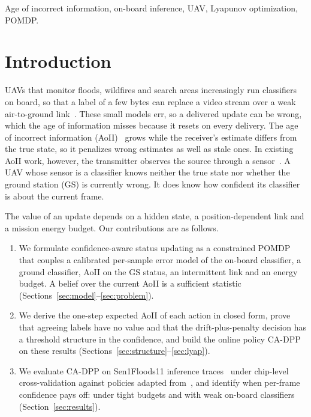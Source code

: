 \documentclass[conference]{IEEEtran}
\theoremstyle{remark}
\begin{document}
\begin{IEEEkeywords}
Age of incorrect information, on-board inference, UAV, Lyapunov optimization, POMDP.
\end{IEEEkeywords}

\section{Introduction}
UAVs that monitor floods, wildfires and search areas increasingly run classifiers on board, so that a label of a few bytes can replace a video stream over a weak air-to-ground link~\cite{shamsoshoara2021flame,kyrkou2020aider}. These small models err, so a delivered update can be wrong, which the age of information misses because it resets on every delivery. The age of incorrect information (AoII)~\cite{maatouk2020aoii} grows while the receiver's estimate differs from the true state, so it penalizes wrong estimates as well as stale ones. In existing AoII work, however, the transmitter observes the source through a sensor~\cite{maatouk2020aoii,zakeri2023aoiieh,ngo2025eh}. A UAV whose sensor is a classifier knows neither the true state nor whether the ground station (GS) is currently wrong. It does know how confident its classifier is about the current frame.

The value of an update depends on a hidden state, a position-dependent link and a mission energy budget. Our contributions are as follows.
\begin{enumerate}
\item We formulate confidence-aware status updating as a constrained POMDP that couples a calibrated per-sample error model of the on-board classifier, a ground classifier, AoII on the GS status, an intermittent link and an energy budget. A belief over the current AoII is a sufficient statistic (Sections~\ref{sec:model}--\ref{sec:problem}).
\item We derive the one-step expected AoII of each action in closed form, prove that agreeing labels have no value and that the drift-plus-penalty decision has a threshold structure in the confidence, and build the online policy CA-DPP on these results (Sections~\ref{sec:structure}--\ref{sec:lyap}).
\item We evaluate CA-DPP on Sen1Floods11 inference traces~\cite{bonafilia2020sen1floods11} under chip-level cross-validation against policies adapted from~\cite{gan2025taoi,pehlivanoglu2026orbit,basnayaka2025aomi,zakeri2023aoiieh}, and identify when per-frame confidence pays off: under tight budgets and with weak on-board classifiers (Section~\ref{sec:results}).
\end{enumerate}
\end{document}
